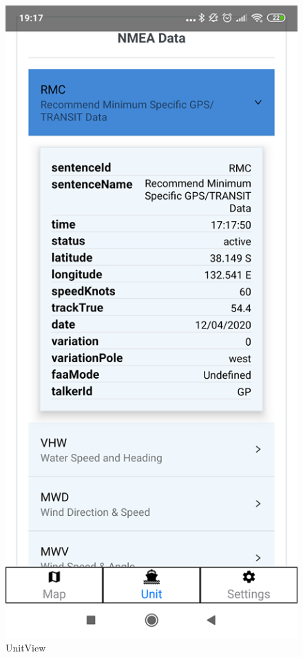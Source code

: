 \documentclass[skorowidz,skroty]{dyplomWEZUT}
\begin{document}
\begin{figure}[H]
  \centering
    \includegraphics[scale=0.2]{graphic/UnitView}
    \caption{UnitView}
    \label{fig:UnitView}
\end{figure}
\end{document}
